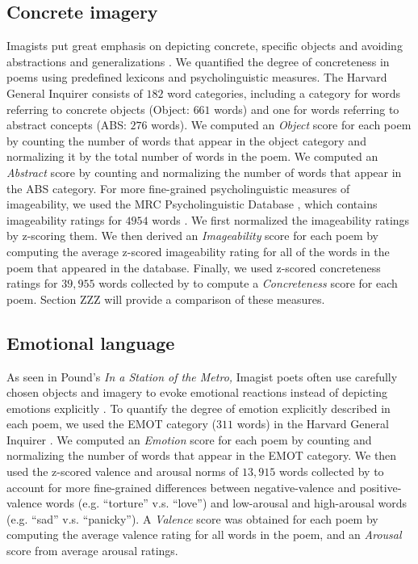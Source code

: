 \documentclass{book}
\begin{document}
\subsection{Concrete imagery}
Imagists put great emphasis on depicting concrete, specific objects and avoiding abstractions and generalizations \citep{aldington1916some}. We quantified the degree of concreteness in poems using predefined lexicons and psycholinguistic measures. The Harvard General Inquirer \citep{Inquirer+1966} consists of $182$ word categories, including a category for words referring to concrete objects (Object: $661$ words) and one for words referring to abstract concepts (ABS: $276$ words). We computed an \emph{Object} score for each poem by counting the number of words that appear in the object category and normalizing it by the total number of words in the poem. We computed an \emph{Abstract} score by counting and normalizing the number of words that appear in the ABS category. For more fine-grained psycholinguistic measures of imageability, we used the MRC Psycholinguistic Database \citep{wilson1988mrc}, which contains imageability ratings for $4954$ words \citep{coltheart1981mrc}. We first normalized the imageability ratings by z-scoring them. We then derived an \emph{Imageability} score for each poem by computing the average z-scored imageability rating for all of the words in the poem that appeared in the database. Finally, we used z-scored concreteness ratings for $39,955$ words collected by \citet{brysbaert2013concreteness} to compute a \emph{Concreteness} score for each poem. Section ZZZ will provide a comparison of these measures. 
\subsection{Emotional language}
As seen in Pound's \emph{In a Station of the Metro,} Imagist poets often use carefully chosen objects and imagery to evoke emotional reactions instead of depicting emotions explicitly  \citep{hamilton2004toward}. To quantify the degree of emotion explicitly described in each poem, we used the EMOT category ($311$ words) in the Harvard General Inquirer \citep{Inquirer+1966}. We computed an \emph{Emotion} score for each poem by counting and normalizing the number of words that appear in the EMOT category. We then used the z-scored valence and arousal norms of $13,915$ words collected by \citet{warriner2013norms} to account for more fine-grained differences between negative-valence and positive-valence words (e.g. ``torture'' v.s. ``love'') and low-arousal and high-arousal words (e.g. ``sad'' v.s. ``panicky''). A \emph{Valence} score was obtained for each poem by computing the average valence rating for all words in the poem, and an \emph{Arousal} score from average arousal ratings.
\end{document}
